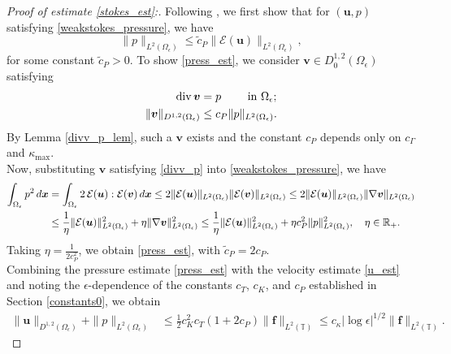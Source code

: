 \documentclass[11pt]{article}
\numberwithin{equation}{section}
\newcommand{\R}{\mathbb{R}}
\newcommand{\T}{\mathbb{T}}
\newcommand{\E}{\mathcal{E}}
\newcommand{\bu}{\bm{u}}
\newcommand{\bx}{\bm{x}}
\newcommand{\bv}{\bm{v}}
\newcommand{\ts}{\thinspace}
\newcommand{\dive}{{\rm{div}}}
\theoremstyle{definition}
\begin{document}
\begin{proof}[Proof of estimate \eqref{stokes_est}:]
Following \cite{galdi2011introduction}, we first show that for $(\bu,p)$ satisfying \eqref{weakstokes_pressure}, we have
\begin{equation}\label{press_est}
\|p\|_{L^2(\Omega_{\epsilon})} \le \tilde c_P\|\E(\bu)\|_{L^2(\Omega_{\epsilon})},
\end{equation}
for some constant $\tilde c_P>0$. To show \eqref{press_est}, we consider $\bv\in D^{1,2}_0(\Omega_{\epsilon})$ satisfying
\begin{equation}\label{divv_p}
\begin{aligned}
\dive\ts \bv &= p \qquad \text{ in }\Omega_{\epsilon}; \\
\|\bv\|_{D^{1,2}(\Omega_{\epsilon})} &\le c_P\| p\|_{L^2(\Omega_{\epsilon})}. 
\end{aligned}
\end{equation}
By Lemma \ref{divv_p_lem}, such a $\bv$ exists and the constant $c_P$ depends only on $c_\Gamma$ and $\kappa_{\max}$. \\

 Now, substituting $\bv$ satisfying \eqref{divv_p} into \eqref{weakstokes_pressure}, we have 
\begin{align*}
\int_{\Omega_{\epsilon}} p^2 \ts d\bx &= \int_{\Omega_{\epsilon}} 2 \ts\E(\bu):\E(\bv) \ts d\bx \le 2\|\E(\bu)\|_{L^2(\Omega_{\epsilon})}\|\E(\bv)\|_{L^2(\Omega_{\epsilon})} \le 2\|\E(\bu)\|_{L^2(\Omega_{\epsilon})}\|\nabla\bv\|_{L^2(\Omega_{\epsilon})} \\
& \le \frac{1}{\eta}\|\E(\bu)\|_{L^2(\Omega_{\epsilon})}^2+ \eta\|\nabla\bv\|_{L^2(\Omega_{\epsilon})}^2 \le \frac{1}{\eta}\|\E(\bu)\|_{L^2(\Omega_{\epsilon})}^2+ \eta c_P^2\|p\|_{L^2(\Omega_{\epsilon})}^2, \quad \eta\in\R_+. 
\end{align*}
Taking $\eta=\frac{1}{2c_P^2}$, we obtain \eqref{press_est}, with $\tilde c_P= 2c_P$. \\

Combining the pressure estimate \eqref{press_est} with the velocity estimate \eqref{u_est} and noting the $\epsilon$-dependence of the constants $c_T$, $c_K$, and $c_P$ established in Section \ref{constants0}, we obtain 
\begin{align*}
\|\bu\|_{D^{1,2}(\Omega_{\epsilon})} + \|p\|_{L^2(\Omega_{\epsilon})} &\le \frac{1}{2}c_K^2c_T(1+2c_P) \|{\bm f}\|_{L^2(\T)} \le c_{\kappa}|\log\epsilon|^{1/2}\|{\bm f}\|_{L^2(\T)}.
\end{align*}

\end{proof}
\end{document}

